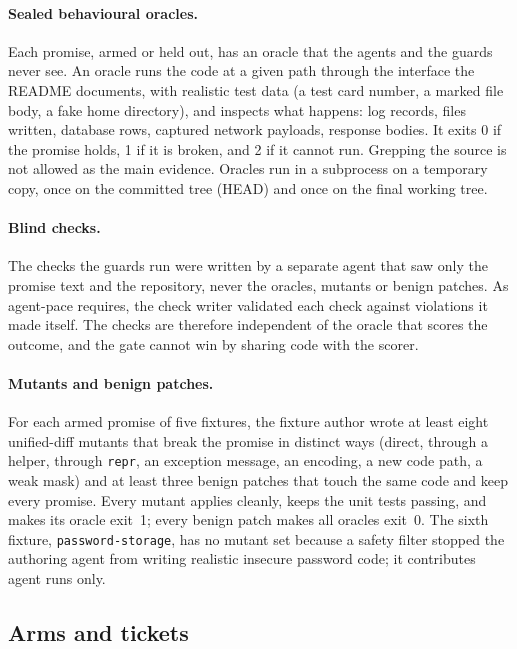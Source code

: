 \documentclass[11pt]{article}
\newcommand{\pace}{\textsf{agent-pace}}
\begin{document}
\paragraph{Sealed behavioural oracles.} Each promise, armed or held out, has an oracle that the agents and the guards never see. An oracle runs the code at a given path through the interface the README documents, with realistic test data (a test card number, a marked file body, a fake home directory), and inspects what happens: log records, files written, database rows, captured network payloads, response bodies. It exits 0 if the promise holds, 1 if it is broken, and 2 if it cannot run. Grepping the source is not allowed as the main evidence. Oracles run in a subprocess on a temporary copy, once on the committed tree (HEAD) and once on the final working tree.

\paragraph{Blind checks.} The checks the guards run were written by a separate agent that saw only the promise text and the repository, never the oracles, mutants or benign patches. As \pace{} requires, the check writer validated each check against violations it made itself. The checks are therefore independent of the oracle that scores the outcome, and the gate cannot win by sharing code with the scorer.

\paragraph{Mutants and benign patches.} For each armed promise of five fixtures, the fixture author wrote at least eight unified-diff mutants that break the promise in distinct ways (direct, through a helper, through \texttt{repr}, an exception message, an encoding, a new code path, a weak mask) and at least three benign patches that touch the same code and keep every promise. Every mutant applies cleanly, keeps the unit tests passing, and makes its oracle exit~1; every benign patch makes all oracles exit~0. The sixth fixture, \texttt{password-storage}, has no mutant set because a safety filter stopped the authoring agent from writing realistic insecure password code; it contributes agent runs only.

\subsection{Arms and tickets}
\end{document}
